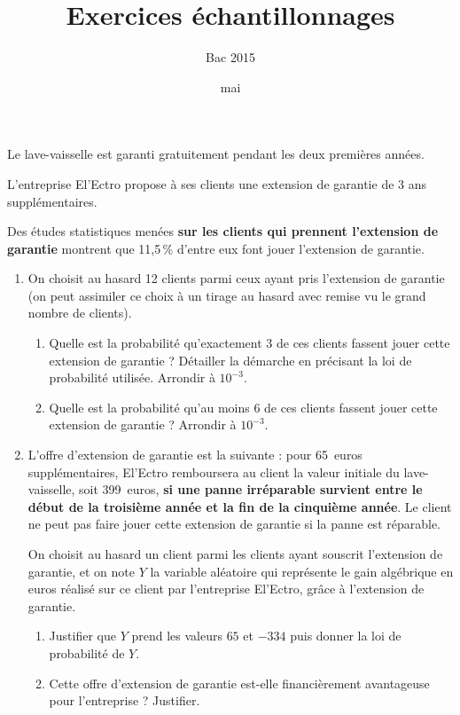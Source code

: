 \documentclass[12pt,frenchb]{article}
\title{Exercices échantillonnages}
\date{mai \the\year}
\author{Bac 2015}
\begin{document}
\maketitle

\begin{question}[subtitle={Pondichéry 2015}]
Le lave-vaisselle est garanti gratuitement pendant les deux premières années.

L'entreprise El'Ectro propose à ses clients une extension de garantie de 3 ans
supplémentaires.

Des études statistiques menées \textbf{sur les clients qui prennent l'extension de garantie}
montrent que 11,5\,\% d'entre eux font jouer l'extension de garantie.

\medskip

\begin{enumerate}
\item On choisit au hasard 12 clients parmi ceux ayant pris l'extension de garantie (on peut
assimiler ce choix à un tirage au hasard avec remise vu le grand nombre de clients).
	\begin{enumerate}
		\item Quelle est la probabilité qu'exactement 3 de ces clients fassent jouer cette
extension de garantie ? Détailler la démarche en précisant la loi de probabilité
utilisée. Arrondir à $10^{-3}$.
		\item Quelle est la probabilité qu'au moins 6 de ces clients fassent jouer cette extension de garantie ? Arrondir à $10^{-3}$.
	\end{enumerate}
\item  L'offre d'extension de garantie est la suivante : pour 65~euros supplémentaires,
El'Ectro remboursera au client la valeur initiale du lave-vaisselle, soit 399~euros, \textbf{si
une panne irréparable survient entre le début de la troisième année et la fin de la
cinquième année}. Le client ne peut pas faire jouer cette extension de garantie si la
panne est réparable.
	
On choisit au hasard un client parmi les clients ayant souscrit l'extension de garantie,
et on note $Y$ la variable aléatoire qui représente le gain algébrique en euros réalisé sur
ce client par l'entreprise El'Ectro, grâce à l'extension de garantie.
	
\medskip
	
	\begin{enumerate}
		\item Justifier que $Y$ prend les valeurs $65$ et $- 334$ puis donner la loi de probabilité de $Y$.
		\item Cette offre d'extension de garantie est-elle financièrement avantageuse pour
l'entreprise ? Justifier.
	\end{enumerate}
\end{enumerate}
\end{question}
\end{document}
